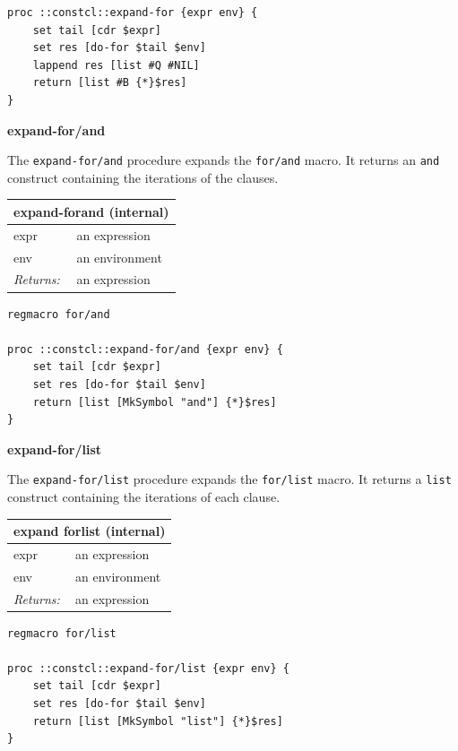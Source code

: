 \documentclass[twoside,9pt]{report}
\begin{document}
\noindent\makebox[\linewidth]{\rule{\linewidth}{0.4pt}}
\begin{lstlisting}
proc ::constcl::expand-for {expr env} {
    set tail [cdr $expr]
    set res [do-for $tail $env]
    lappend res [list #Q #NIL]
    return [list #B {*}$res]
}
\end{lstlisting}
\noindent\makebox[\linewidth]{\rule{\linewidth}{0.4pt}}

\textbf{expand-for/and}


The \texttt{expand-for/and} procedure expands the \texttt{for/and} macro. It returns an \texttt{and} construct containing the iterations of the clauses.

\begin{tabular}{ |l l| }
\hline
\multicolumn{2}{|l|}{expand-forand (internal)} \\
\hline
expr & an expression \\
env & an environment \\
\textit{Returns:} & an expression \\
\hline
\end{tabular}

\noindent\makebox[\linewidth]{\rule{\linewidth}{0.4pt}}
\begin{lstlisting}
regmacro for/and
 
proc ::constcl::expand-for/and {expr env} {
    set tail [cdr $expr]
    set res [do-for $tail $env]
    return [list [MkSymbol "and"] {*}$res]
}
\end{lstlisting}
\noindent\makebox[\linewidth]{\rule{\linewidth}{0.4pt}}

\textbf{expand-for/list}


The \texttt{expand-for/list} procedure expands the \texttt{for/list} macro. It returns a \texttt{list} construct containing the iterations of each clause.

\begin{tabular}{ |l l| }
\hline
\multicolumn{2}{|l|}{expand forlist (internal)} \\
\hline
expr & an expression \\
env & an environment \\
\textit{Returns:} & an expression \\
\hline
\end{tabular}

\noindent\makebox[\linewidth]{\rule{\linewidth}{0.4pt}}
\begin{lstlisting}
regmacro for/list
 
proc ::constcl::expand-for/list {expr env} {
    set tail [cdr $expr]
    set res [do-for $tail $env]
    return [list [MkSymbol "list"] {*}$res]
}
\end{lstlisting}
\noindent\makebox[\linewidth]{\rule{\linewidth}{0.4pt}}
\end{document}

